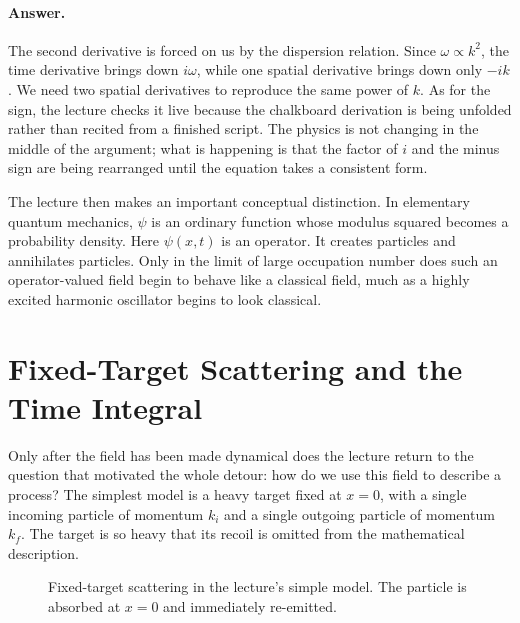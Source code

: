 \paragraph{Answer.} The second derivative is forced on us by the dispersion relation. Since \(\omega\propto k^2\), the time derivative brings down \(i\omega\), while one spatial derivative brings down only \(-ik\). We need two spatial derivatives to reproduce the same power of \(k\). As for the sign, the lecture checks it live because the chalkboard derivation is being unfolded rather than recited from a finished script. The physics is not changing in the middle of the argument; what is happening is that the factor of \(i\) and the minus sign are being rearranged until the equation takes a consistent form.

The lecture then makes an important conceptual distinction. In elementary quantum mechanics, \(\psi\) is an ordinary function whose modulus squared becomes a probability density. Here \(\psi(x,t)\) is an operator. It creates particles and annihilates particles. Only in the limit of large occupation number does such an operator-valued field begin to behave like a classical field, much as a highly excited harmonic oscillator begins to look classical.

\section{Fixed-Target Scattering and the Time Integral}

Only after the field has been made dynamical does the lecture return to the question that motivated the whole detour: how do we use this field to describe a process? The simplest model is a heavy target fixed at \(x=0\), with a single incoming particle of momentum \(k_i\) and a single outgoing particle of momentum \(k_f\). The target is so heavy that its recoil is omitted from the mathematical description.

\begin{figure}[h]
\centering
{}
\caption{Fixed-target scattering in the lecture's simple model. The particle is absorbed at \(x=0\) and immediately re-emitted.}
\end{figure}

